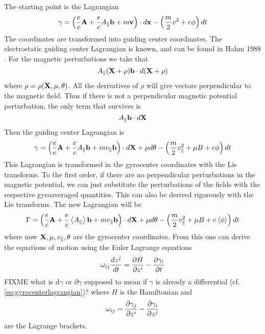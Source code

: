 The starting point is the Lagrangian 
\begin{equation}
  \gamma=\left({e\over c}{\bf A}+{e\over c}A_{\parallel}{\bf b}+m{\bf v} \right)\cdot d{\bf x}-\left({m\over 2}v^{2}+e\phi \right)dt
\end{equation}
The coordinates are transformed into guiding center coordinates. The electrostatic guiding center
Lagrangian is known, and can be found in Hahm 1988 \cite{HAH88}. For the magnetic perturbations we take that
\begin{equation}
  A_{\parallel}({\bf X}+{\bf \rho}){\bf b} \cdot d({\bf X}+\rho)
\end{equation}
where $\rho =\rho({\bf X},{\mu},{\theta})$. All the derivatives of $\rho$ will give vectors
perpendicular to the magnetic field. Thus if there is not a perpendicular magnetic potential
perturbation, the only term that survives is
$$A_{\parallel}{\bf b}\cdot d{\bf X}$$
Then the guiding center Lagrangian is
\begin{equation}
\gamma =\left({e\over c}{\bf A}+{e\over c}A_{\parallel}{\bf b}+mv_{\parallel}{\bf b} \right)\cdot 
d{\bf X}+\mu d\theta -\left({m\over 2}v_{\parallel}^{2}+\mu B+e\phi \right)dt
\end{equation}
This Lagrangian is transformed in the gyrocenter coordinates with the Lie transforms.
To the first order, if there are no perpendicular perturbations in the magnetic potential,
we can just substitute the perturbations of the fields with the respective gyroaveraged quantities. 
This can also be derived rigorously with the Lie transforms. The new Lagrangian will be
\begin{equation}
\Gamma =\left({e\over c}{\bf A}+{e\over c}\left\langle A_{\parallel}\right\rangle{\bf b}+mv_{\parallel}{\bf b} \right)\cdot 
d{\bf X}+\mu d\theta -\left({m\over 2}v_{\parallel}^{2}+\mu B+e\left\langle \phi\right\rangle \right)dt
\label{eq:gyrocenterlagrangian}
\end{equation}
where now ${\bf X},\mu,v_{\parallel},\theta$ are the gyrocenter coordinates. From this one can derive 
the equations of motion using the Euler Lagrange equations
\begin{equation}
\omega_{ij}{dz^{j}\over dt}={\partial H \over \partial z^{i}}-{\partial \gamma_{i}\over \partial t}
\end{equation}
FIXME what is $\mathrm{d}\gamma$ or $\partial\gamma$ supposed to mean if $\gamma$ is already a differential (cf. \eqref{eq:gyrocenterlagrangian})?
where $H$ is the Hamiltonian and 
\begin{equation}
\omega_{ij}={\partial \gamma_{j}\over \partial z^{i}}-{\partial \gamma_{i}\over \partial z^{j}}
\end{equation}
are the Lagrange brackets.

